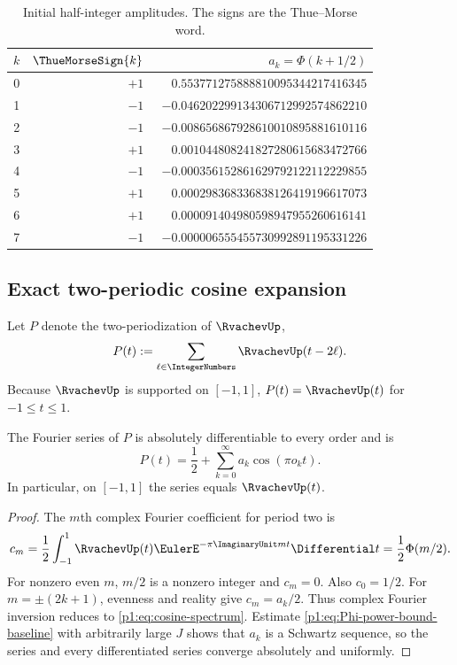 \documentclass[11pt,oneside]{article}
\theoremstyle{definition}
\theoremstyle{remark}
\newcommand{\PhiU}{\Phi}
\begin{document}
\begin{table}[ht]
\centering\small
\begin{tabular}{@{}r r r@{}}
\toprule
$k$ & $\ThueMorseSign{k}$ & $a_k=\PhiU(k+1/2)$ \\
\midrule
0 & $+1$ & $\phantom{-}0.553771275888810095344217416345$ \\
1 & $-1$ & $-0.046202299134306712992574862210$ \\
2 & $-1$ & $-0.008656867928610010895881610116$ \\
3 & $+1$ & $\phantom{-}0.001044808241827280615683472766$ \\
4 & $-1$ & $-0.000356152861629792122112229855$ \\
5 & $+1$ & $\phantom{-}0.000298368336838126419196617073$ \\
6 & $+1$ & $\phantom{-}0.000091404980598947955260616141$ \\
7 & $-1$ & $-0.000006555455730992891195331226$ \\
\bottomrule
\end{tabular}
\caption{Initial half-integer amplitudes.  The signs are the Thue--Morse word.}
\label{p1:tab:first-amplitudes}
\end{table}

\subsection{Exact two-periodic cosine expansion}

Let $P$ denote the two-periodization of $\RvachevUp$,
\begin{equation}\label{p1:eq:P-periodization}
 P(t):=\sum_{\ell\in\IntegerNumbers}\RvachevUp(t-2\ell).
\end{equation}
Because $\RvachevUp$ is supported on $[-1,1]$, $P(t)=\RvachevUp(t)$ for $-1\le t\le1$.

\begin{proposition}\label{p1:prop:cosine-spectrum}
The Fourier series of $P$ is absolutely differentiable to every order and is
\begin{equation}\label{p1:eq:cosine-spectrum}
 \boxed{
 P(t)=\frac12+\sum_{k=0}^{\infty}a_k\cos(\pi o_k t).}
\end{equation}
In particular, on $[-1,1]$ the series equals $\RvachevUp(t)$.
\end{proposition}

\begin{proof}
The $m$th complex Fourier coefficient for period two is
\[
 c_m=\frac12\int_{-1}^{1}\RvachevUp(t)\EulerE^{-\pi\ImaginaryUnit mt}\Differential t
 =\frac12\PhiU(m/2).
\]
For nonzero even $m$, $m/2$ is a nonzero integer and $c_m=0$.  Also
$c_0=1/2$.  For $m=\pm(2k+1)$, evenness and reality give
$c_m=a_k/2$.  Thus complex Fourier inversion reduces to
\eqref{p1:eq:cosine-spectrum}.  Estimate \eqref{p1:eq:Phi-power-bound-baseline} with
arbitrarily large $J$ shows that $a_k$ is a Schwartz sequence, so the series
and every differentiated series converge absolutely and uniformly.
\end{proof}
\end{document}
